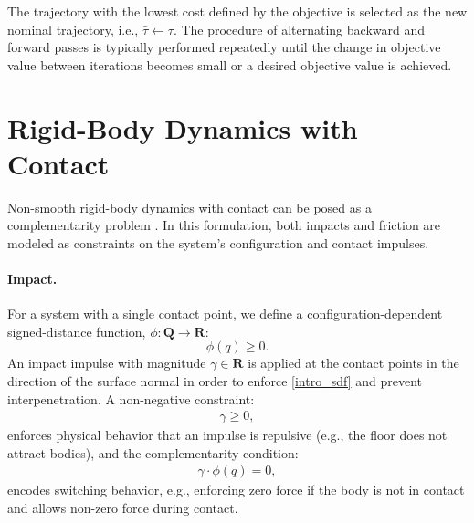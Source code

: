 The trajectory with the lowest cost defined by the objective is selected as the new nominal trajectory, i.e., $\bar{\tau} \leftarrow \tau$. The procedure of alternating backward and forward passes is typically performed repeatedly until the change in objective value between iterations becomes small or a desired objective value is achieved.

\section{Rigid-Body Dynamics with Contact}
Non-smooth rigid-body dynamics with contact can be posed as a complementarity problem \cite{stewart1996implicit}. In this formulation, both impacts and friction are modeled as constraints on the system's configuration and contact impulses.

\paragraph{Impact.} For a system with a single contact point, we define a configuration-dependent signed-distance function, $\phi : \mathbf{Q} \rightarrow \mathbf{R}$:
\begin{equation} 
	\phi(q) \geq 0. \label{intro_sdf}
\end{equation}
An impact impulse with magnitude $\gamma \in \mathbf{R}$ is applied at the contact points in the direction of the surface normal in order to enforce \eqref{intro_sdf} and prevent interpenetration. A non-negative constraint:
\begin{align}
	\gamma \geq 0, \label{intro_impact_inequality}
\end{align}
enforces physical behavior that an impulse is repulsive (e.g., the floor does not attract bodies), and the complementarity condition:
\begin{align}
	\gamma \cdot \phi(q) = 0, \label{intro_impact_complementarity}
\end{align}
encodes switching behavior, e.g., enforcing zero force if the body is not in contact and allows non-zero force during contact.


